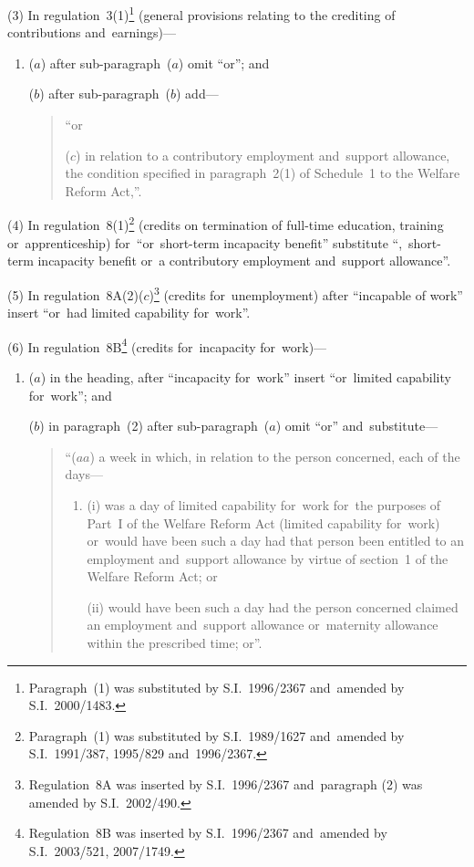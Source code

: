 \documentclass[12pt,a4paper]{article}
\begin{document}
(3) In regulation~3(1)\footnote{Paragraph~(1) was substituted by S.I.~1996/2367 and~amended by S.I.~2000/1483.} (general provisions relating to the crediting of contributions and~earnings)—
\begin{enumerate}\item[]
($a$) after sub-paragraph~($a$)  omit “or”; and

($b$) after sub-paragraph~($b$)  add—
\begin{quotation}
“or

($c$) in relation to a contributory employment and~support allowance, the condition specified in paragraph~2(1) of Schedule~1 to the Welfare Reform Act,”.
\end{quotation}
\end{enumerate}

(4) In regulation~8(1)\footnote{Paragraph~(1) was substituted by S.I.~1989/1627 and~amended by S.I.~1991/387, 1995/829 and~1996/2367.} (credits on termination of full-time education, training or~apprenticeship) for~“or~short-term incapacity benefit” substitute “,~short-term incapacity benefit or~a contributory employment and~support allowance”.

(5) In regulation~8A(2)($c$)\footnote{Regulation~8A was inserted by S.I.~1996/2367 and~paragraph (2) was amended by S.I.~2002/490.} (credits for~unemployment) after “incapable of work” insert “or~had limited capability for~work”.

(6) In regulation~8B\footnote{Regulation~8B was inserted by S.I.~1996/2367 and~amended by S.I.~2003/521, 2007/1749.} (credits for~incapacity for~work)—
\begin{enumerate}\item[]
($a$) in the heading, after “incapacity for~work” insert “or~limited capability for~work”; and

($b$) in paragraph~(2) after sub-paragraph~($a$)  omit “or” and~substitute—
\begin{quotation}
“($aa$) a week in which, in relation to the person concerned, each of the days—
\begin{enumerate}\item[]
(i) was a day of limited capability for~work for~the purposes of Part~I of the Welfare Reform Act (limited capability for~work) or~would have been such a day had that person been entitled to an employment and~support allowance by virtue of section~1 of the Welfare Reform Act; or

(ii) would have been such a day had the person concerned claimed an employment and~support allowance or~maternity allowance within the prescribed time; or”.
\end{enumerate}
\end{quotation}
\end{enumerate}
\end{document}
